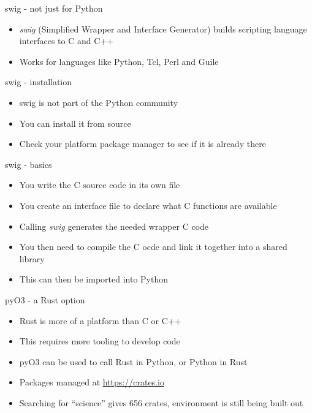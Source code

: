 \documentclass[presentation]{beamer}
\begin{document}
\begin{frame}[label=swig---not-just-for-python]{swig - not just for Python}
\begin{itemize}
\item \alert{\emph{swig}} (Simplified Wrapper and Interface Generator) builds scripting
language interfaces to C and C++
\item Works for languages like Python, Tcl, Perl and Guile
\end{itemize}
\end{frame}
\begin{frame}[label=swig---installation]{swig - installation}
\begin{itemize}
\item swig is not part of the Python community
\item You can install it from source
\item Check your platform package manager to see if it is already there
\end{itemize}
\end{frame}
\begin{frame}[label=swig---basics]{swig - basics}
\begin{itemize}
\item You write the C source code in its own file
\item You create an interface file to declare what C functions are available
\item Calling \alert{\emph{swig}} generates the needed wrapper C code
\item You then need to compile the C ocde and link it together into a shared
library
\item This can then be imported into Python
\end{itemize}
\end{frame}
\begin{frame}[label=pyo3---a-rust-option]{pyO3 - a Rust option}
\begin{itemize}
\item Rust is more of a platform than C or C++
\item This requires more tooling to develop code
\item pyO3 can be used to call Rust in Python, or Python in Rust
\item Packages managed at \url{https://crates.io}
\item Searching for ``science'' gives 656 crates, environment is still being
built out
\end{itemize}
\end{frame}
\end{document}
